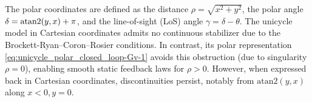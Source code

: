 \documentclass[letterpaper, 10 pt, conference]{ieeeconf}  %
\begin{document}
The polar coordinates are defined as the distance \(\rho=\sqrt{x^2+y^2}\), the polar angle \(\delta=\text{{\rm atan2}}(y,x)+\pi\), and the line-of-sight (LoS) angle \(\gamma=\delta-\theta\). 
The unicycle model %
in Cartesian coordinates admits no continuous stabilizer due to the Brockett-Ryan–Coron–Rosier conditions. In contrast, its polar representation \eqref{eq:unicycle_polar_closed_loop-Gv-1} avoids this obstruction (due to singularity $\rho=0$), enabling smooth static feedback laws for $\rho>0$. However, when expressed back in Cartesian coordinates, discontinuities persist, notably from $\text{atan2}(y,x)$ along ${x<0,y=0}$.


\label{sec-preliminaries}
\end{document}
